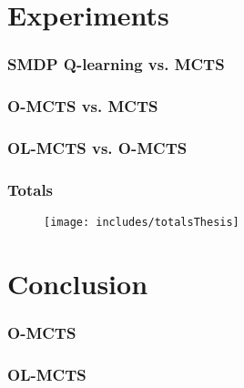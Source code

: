 \documentclass{beamer}
\begin{document}
\section{Experiments}
\begin{frame}
	\frametitle{SMDP Q-learning vs. MCTS}
	\begin{figure}
	\centering
	\end{figure}
	\begin{figure}
	\centering
	\end{figure}
\end{frame}

\begin{frame}
	\frametitle{O-MCTS vs. MCTS}
	\begin{figure}
	\centering
	\end{figure}
	\begin{figure}
	\centering
	\end{figure}
\end{frame}

\begin{frame}
	\frametitle{OL-MCTS vs. O-MCTS}
	\begin{figure}
	\centering
	\end{figure}
	\begin{figure}
	\centering
	\end{figure}
\end{frame}

\begin{frame}
	\frametitle{Totals}
	\begin{figure}
	\centering
	\texttt{[image: includes/totalsThesis]}
	\end{figure}
\end{frame}

\section{Conclusion}
\begin{frame}
	\frametitle{O-MCTS}
\end{frame}

\begin{frame}
	\frametitle{OL-MCTS}
\end{frame}
\end{document}

